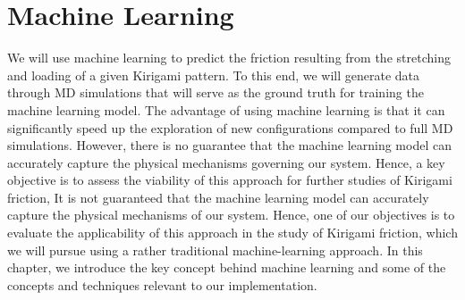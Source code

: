 \chapter{Machine Learning}\label{chap:ML}
We will use machine learning to predict the friction resulting from the stretching
and loading of a given Kirigami pattern. To this end, we will generate data through \acrshort{MD} simulations that will serve as the ground truth for training the machine learning model. The advantage of using machine learning is that it can significantly speed up the exploration of new configurations compared to full \acrshort{MD} simulations. However, there is no guarantee that the machine learning model can accurately capture the physical mechanisms governing our system. Hence, a key objective is to assess
the viability of this approach for further studies of Kirigami friction, It is not guaranteed that the machine learning model can accurately
capture the physical mechanisms of our system. Hence, one of our objectives is to evaluate the applicability of this approach in the study of Kirigami friction, which we will pursue using a rather traditional machine-learning approach. In this
chapter, we introduce the key concept behind machine learning and some of the concepts and techniques relevant to our implementation.



